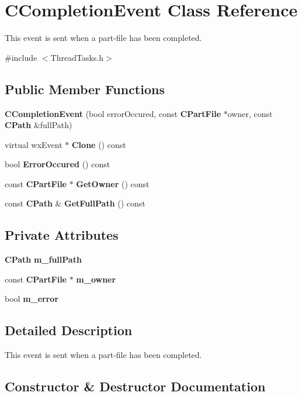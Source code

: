 \section{CCompletionEvent Class Reference}
\label{classCCompletionEvent}


This event is sent when a part-\/file has been completed.  


{\ttfamily \#include $<$ThreadTasks.h$>$}\subsection*{Public Member Functions}
\begin{DoxyCompactItemize}
\item 
{\bf CCompletionEvent} (bool errorOccured, const {\bf CPartFile} $\ast$owner, const {\bf CPath} \&fullPath)
\item 
virtual wxEvent $\ast$ {\bf Clone} () const 
\item 
bool {\bf ErrorOccured} () const 
\item 
const {\bf CPartFile} $\ast$ {\bf GetOwner} () const 
\item 
const {\bf CPath} \& {\bf GetFullPath} () const 
\end{DoxyCompactItemize}
\subsection*{Private Attributes}
\begin{DoxyCompactItemize}
\item 
{\bf CPath} {\bf m\_\-fullPath}\label{classCCompletionEvent_a78a9bfbe83a3c080c877b08d6a10c3f9}

\item 
const {\bf CPartFile} $\ast$ {\bf m\_\-owner}\label{classCCompletionEvent_a29bb22341dddb080446d1a70cb7074ae}

\item 
bool {\bf m\_\-error}\label{classCCompletionEvent_a159c8e18a84c1d16c1d23ca840792a37}

\end{DoxyCompactItemize}


\subsection{Detailed Description}
This event is sent when a part-\/file has been completed. 

\subsection{Constructor \& Destructor Documentation}
